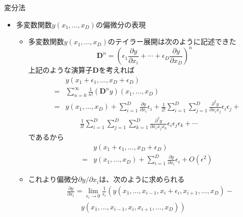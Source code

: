 \documentclass[dvipdfmx,notheorems,t]{beamer}
\begin{document}
\begin{frame}{変分法}

\begin{itemize}	
	\item 多変数関数$y(x_1, \ldots, x_D)$の偏微分の表現
	\begin{itemize}
		\item 多変数関数$y(x_1, \ldots, x_D)$のテイラー展開は次のように記述できた
		\begin{equation}
			\bm{D}^n = \left( \epsilon_1 \frac{\partial y}{\partial x_i} + \cdots + \epsilon_D \frac{\partial y}{\partial x_D} \right)^n
		\end{equation}
		上記のような演算子$\bm{D}$を考えれば
		\begin{eqnarray}
			&& y(x_1 + \epsilon_1, \ldots, x_D + \epsilon_D) \nonumber \\
			&=& \sum_{n = 0}^\infty \frac{1}{n!} (\bm{D}^n y)(x_1, \ldots, x_D) \\
			&=& y(x_1, \ldots, x_D) + \sum_{i = 1}^D \frac{\partial y}{\partial x_i} \epsilon_i + \frac{1}{2!} \sum_{i = 1}^D \sum_{j = 1}^D \frac{\partial^2 y}{\partial x_i x_j} \epsilon_i \epsilon_j + \nonumber \\
			&& \qquad \frac{1}{3!} \sum_{i = 1}^D \sum_{j = 1}^D \sum_{k = 1}^D \frac{\partial^3 y}{\partial x_i x_j x_k} \epsilon_i \epsilon_j \epsilon_k + \cdots
		\end{eqnarray}
		であるから
		\begin{eqnarray}
			&& y(x_1 + \epsilon_1, \ldots, x_D + \epsilon_D) \nonumber \\
			&=& y(x_1, \ldots, x_D) + \sum_{i = 1}^D \frac{\partial y}{\partial x_i} \epsilon_i + O(\epsilon^2)
		\end{eqnarray}
		
		\item これより偏微分$\partial y/\partial x_i$は、次のように求められる
		\begin{eqnarray}
			&& \frac{\partial y}{\partial x_i} = \lim_{\epsilon_i \to 0} \frac{1}{\epsilon_i} \left( y(x_1, \ldots, x_{i - 1}, x_i + \epsilon_i, x_{i + 1}, \ldots, x_D) - \right. \nonumber \\
			&& \qquad \left. y(x_1, \ldots, x_{i - 1}, x_i, x_{i + 1}, \ldots, x_D) \right)
		\end{eqnarray}
	\end{itemize}
\end{itemize}

\end{frame}
\end{document}
